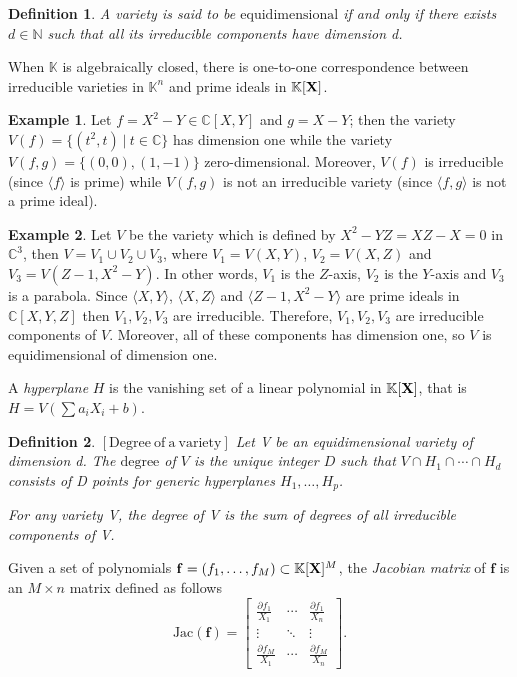 \documentclass[11pt]{article}
\numberwithin{Property}{section}
\numberwithin{Theorem}{section}
\numberwithin{Proposition}{section}
\numberwithin{Lemma}{section}
\numberwithin{Corollary}{section}
\newtheorem{Definition}{Definition}%
\numberwithin{Definition}{section}
\numberwithin{Remark}{section}
\numberwithin{Conjecture}{section}
\numberwithin{Problem}{section}
\numberwithin{Claim}{section}
\theoremstyle{definition}
\newtheorem{Example}{Example}%
\numberwithin{Example}{section}
\newcommand{\field}{\mathbb{K}} %
\newcommand{\mat}[1]{\mathbf{\MakeUppercase{#1}}} %
\newcommand{\todo}[1]{\textcolor{red}{#1}} %
\begin{document}
\begin{Definition} A variety is said to be $\mathrm{equidimensional}$ if and only if there exists $d \in \mathbb{N}$ such that all its irreducible components have dimension d. 
\end{Definition}

When $\field$ is algebraically closed, there is one-to-one correspondence between irreducible varieties in $\field^n$ and prime ideals in $\field[\mat{X}]$. 

\begin{Example}Let $f = X^2-Y \in \mathbb{C}[X,Y]$ and $g = X-Y$; then the variety $V(f) = \{(t^2,t) \ | \ t \in \mathbb{C}\}$ has dimension one while the variety $V(f,g) = \{(0,0), (1,-1)\}$ zero-dimensional. Moreover, $V(f)$ is irreducible (since $\langle f \rangle$ is prime) while $V(f,g)$ is not an irreducible variety (since $\langle f,g \rangle$ is not a prime ideal). 
\end{Example}

\begin{Example} Let $V$ be the variety which is defined by $X^2 - YZ = XZ-X = 0$ in $\mathbb{C}^3$, then $V = V_1 \cup V_2 \cup V_3$, where $V_1 = V(X,Y)$, $V_2 = V(X,Z)$ and $V_3 = V(Z-1,X^2 - Y)$. In other words, $V_1$ is the $Z$-axis, $V_2$ is the $Y$-axis and $V_3$ is a parabola.  Since $\langle X,Y\rangle$, $\langle X,Z\rangle$ and $\langle Z-1,X^2 - Y \rangle$ are prime ideals in $\mathbb{C}[X,Y,Z]$ then $V_1, V_2, V_3$ are irreducible. Therefore, $V_1, V_2, V_3$ are irreducible components of $V$. Moreover, all of these components has dimension one, so $V$ is equidimensional of dimension one. 
\end{Example}

A \emph{hyperplane} $H$ is the vanishing set of a linear polynomial in $\field[\mat{X}]$, that is $H = V(\sum a_iX_i + b)$. 
\begin{Definition}$\mathrm{[Degree \ of \ a \ variety]}$ Let V be an equidimensional variety of dimension d. The $\mathrm{degree}$ of $V$ is the unique integer $D$ such that $V \cap H_1 \cap \cdots \cap H_d$ consists of D points for generic hyperplanes $H_1, \ldots, H_p$. 

For any variety V, the degree of V is the sum of degrees of all irreducible components of V. %
\end{Definition}

Given a set of polynomials $\mathbf{f} = (f_1, \ldots, f_M) \subset \field[\mat{X}]^M$, the \emph{Jacobian matrix} of $\mathbf{f}$ is an $M \times n$ matrix defined as follows 
\[
\mathrm{Jac}(\mathbf{f}) = \left[ \begin{matrix}
\frac{\partial f_1}{X_1}  & \cdots & \frac{\partial f_1}{X_n}\\
\vdots & \ddots & \vdots\\
\frac{\partial f_M}{X_1}  & \cdots & \frac{\partial f_M}{X_n}
\end{matrix} \right].
\]
\end{document}

